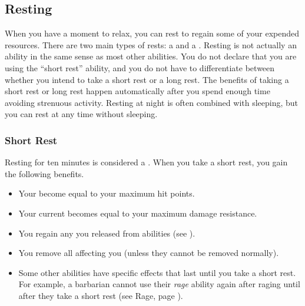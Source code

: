     \subsection{Resting}\label{Resting}
        When you have a moment to relax, you can rest to regain some of your expended resources.
        There are two main types of rests: a  and a .
        Resting is not actually an ability in the same sense as most other abilities.
        You do not declare that you are using the ``short rest'' ability, and you do not have to differentiate between whether you intend to take a short rest or a long rest.
        The benefits of taking a short rest or long rest happen automatically after you spend enough time avoiding strenuous activity.
        Resting at night is often combined with sleeping, but you can rest at any time without sleeping.

        \subsubsection{Short Rest}\label{Short Rest}
            Resting for ten minutes is considered a .
            When you take a short rest, you gain the following benefits.
            \begin{itemize}
                \item Your  become equal to your maximum hit points.
                \item Your current  becomes equal to your maximum damage resistance.
                \item You regain any  you released from  abilities (see ).
                \item You remove all  affecting you (unless they cannot be removed normally).
                \item Some other abilities have specific effects that last until you take a short rest.
                    For example, a barbarian cannot use their \textit{rage} ability again after raging until after they take a short rest (see Rage, page ).
            \end{itemize}

